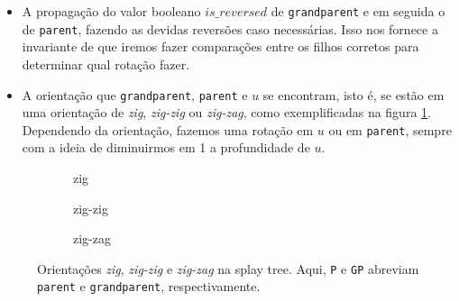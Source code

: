 \begin{itemize}
    \item A propagação do valor booleano $is\_reversed$ de \texttt{grandparent} e em seguida o de \texttt{parent}, fazendo as devidas reversões caso necessárias. Isso nos fornece a invariante de que iremos fazer comparações entre os filhos corretos para determinar qual rotação fazer.
    \item A orientação que \texttt{grandparent}, \texttt{parent} e $u$ se encontram, isto é, se estão em uma orientação de \textit{zig}, \textit{zig-zig} ou \textit{zig-zag}, como exemplificadas na figura \ref{fig:zig-oris}. Dependendo da orientação, fazemos uma rotação em $u$ ou em \texttt{parent}, sempre com a ideia de diminuirmos em 1 a profundidade de $u$.
\end{itemize}

\begin{figure}
    \centering
    \begin{subfigure}[b]{0.3\textwidth}
        \centering
        \caption{zig}
    \end{subfigure}
    \hfill
    \begin{subfigure}[b]{0.3\textwidth}
        \centering
        \caption{zig-zig}
    \end{subfigure}
    \hfill
    \begin{subfigure}[b]{0.3\textwidth}
        \centering
        \caption{zig-zag}
    \end{subfigure}
    \caption{Orientações \textit{zig}, \textit{zig-zig} e \textit{zig-zag} na splay tree. Aqui, \texttt{P} e \texttt{GP} abreviam \texttt{parent} e \texttt{grandparent}, respectivamente.}
    \label{fig:zig-oris}
\end{figure}


